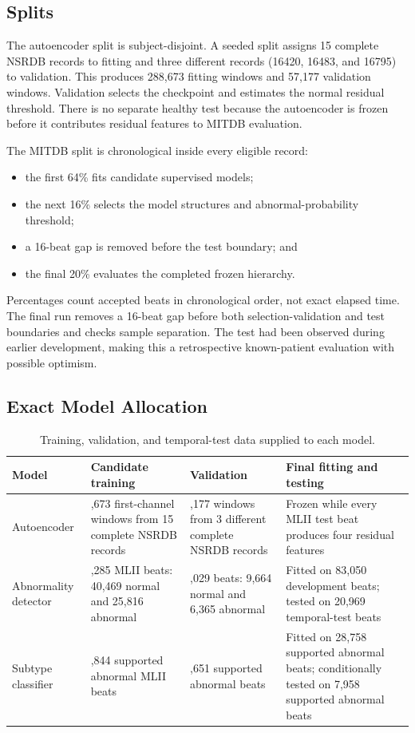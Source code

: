 \subsection{Splits}

The autoencoder split is subject-disjoint. A seeded split assigns 15 complete
NSRDB records to fitting and three different records (16420, 16483, and 16795)
to validation. This produces 288,673 fitting windows and 57,177 validation
windows. Validation selects the checkpoint and estimates the normal residual
threshold. There is no separate healthy test because the autoencoder is frozen
before it contributes residual features to MITDB evaluation.

The MITDB split is chronological inside every eligible record:
\begin{itemize}
    \item the first 64\% fits candidate supervised models;
    \item the next 16\% selects the model structures and abnormal-probability
    threshold;
    \item a 16-beat gap is removed before the test boundary; and
    \item the final 20\% evaluates the completed frozen hierarchy.
\end{itemize}
Percentages count accepted beats in chronological order, not exact elapsed
time. The final run removes a 16-beat gap before both selection-validation and
test boundaries and checks sample separation. The test had been observed
during earlier development, making this a retrospective known-patient
evaluation with possible optimism.

\subsection{Exact Model Allocation}
\begin{table}[H]
\centering
\small
\caption{Training, validation, and temporal-test data supplied to each model.}
\label{tab:data-model-allocation}
\begin{tabular}{>{\raggedright\arraybackslash}p{2.3cm}>{\raggedright\arraybackslash}p{3.0cm}>{\raggedright\arraybackslash}p{3.0cm}>{\raggedright\arraybackslash}p{3.2cm}}
\toprule
Model & Candidate training & Validation & Final fitting and testing\\
\midrule
Autoencoder & 288,673 first-channel windows from 15 complete NSRDB records & 57,177 windows from 3 different complete NSRDB records & Frozen while every MLII test beat produces four residual features\\
\addlinespace
Abnormality detector & 66,285 MLII beats: 40,469 normal and 25,816 abnormal & 16,029 beats: 9,664 normal and 6,365 abnormal & Fitted on 83,050 development beats; tested on 20,969 temporal-test beats\\
\addlinespace
Subtype classifier & 22,844 supported abnormal MLII beats & 5,651 supported abnormal beats & Fitted on 28,758 supported abnormal beats; conditionally tested on 7,958 supported abnormal beats\\
\bottomrule
\end{tabular}
\end{table}

